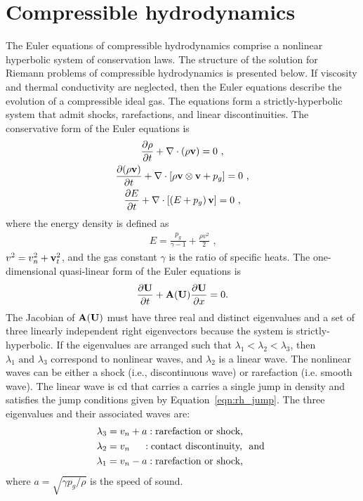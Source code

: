 \section[Compressible hydrodynamics]{Compressible hydrodynamics}
\label{sec:com_hydro}

The Euler equations of compressible hydrodynamics comprise a nonlinear hyperbolic system of conservation laws. The structure of the solution for Riemann problems of compressible hydrodynamics is presented below.  If viscosity and thermal conductivity are neglected, then the Euler equations describe the evolution of a compressible ideal gas.  The equations form a strictly-hyperbolic system that admit shocks, rarefactions, and linear discontinuities.  The conservative form of the Euler equations is
\begin{gather}
\label{eqn:euler1} \frac{\partial \rho}{\partial t} + \mathbf{\nabla} \cdot \left(\rho\mathbf{v}\right) = 0 \text{ ,} \\
\label{eqn:euler2} \frac{\partial (\rho \mathbf{v})}{\partial t} + \mathbf{\nabla} \cdot \left[ \rho\mathbf{v} \otimes \mathbf{v} + p_g \right]  = 0 \text{ ,}\\
\label{eqn:euler3} \frac{\partial E}{\partial t} + \mathbf{\nabla} \cdot \left[ \left(E + p_g \right)\mathbf{v}\right]  = 0 \text{ ,}
\end{gather}
where the energy density is defined as
\begin{gather}
  \label{eqn:energy} E = \frac{p_g}{\gamma - 1} + \frac{\rho v^2}{2}\text{ ,}
\end{gather}
$v^2 = v_n^2 + \mathbf{v}_{t}^2$, and the gas constant $\gamma$ is the ratio of specific heats.  The one-dimensional quasi-linear form of the Euler equations is 
\begin{gather}
\label{eqn:euler_qlin}
\frac{\partial \mathbf{U}}{\partial t} + \mathbf{A}(\mathbf{U})\frac{\partial \mathbf{U}}{\partial x} = 0.
\end{gather}
The Jacobian of $\mathbf{A}(\mathbf{U})$ must have three real and distinct eigenvalues and a set of three linearly independent right eigenvectors because the system is strictly-hyperbolic.  If the eigenvalues are arranged such that $\lambda_1 < \lambda_2 < \lambda_3$, then $\lambda_1  \text{ and } \lambda_3$ correspond to nonlinear waves, and $\lambda_2$ is a linear wave.  The nonlinear waves can be either a shock (i.e., discontinuous wave) or rarefaction (i.e. smooth wave).  The linear wave is \gls{cd} that carries a carries a single jump in density and satisfies the jump conditions given by Equation~\ref{eqn:rh_jump}.  The three eigenvalues and their associated waves are:
\begin{align*}
\lambda_3 &= v_n + a : \text{rarefaction or shock,} \\
\lambda_2 &= v_n \phantom{+ a} : \text{contact discontinuity, \text{ and }} \\
\lambda_1 &= v_n - a : \text{rarefaction or shock,} 
\end{align*}
where $a = \sqrt{\gamma p_g/\rho}$ is the speed of sound.  

